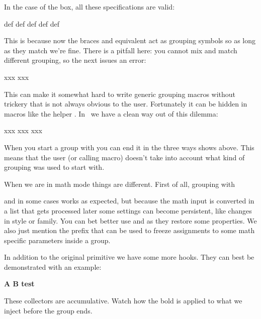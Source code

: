 In the case of the box, all these specifications are valid:

\starttyping[option=TEX]
\hbox {def}
\hbox \bgroup def\egroup
\hbox \bgroup def}
\hbox \bgroup d{e\egroup f}
\hbox {def\egroup
\stoptyping

This is because now the braces and equivalent act as grouping symbols so as long
as they match we're fine. There is a pitfall here: you cannot mix and match
different grouping, so the next issues an error:

\starttyping[option=TEX]
\bgroup xxx\endgroup   %
\begingroup xxx\egroup %
\stoptyping

This can make it somewhat hard to write generic grouping macros without trickery
that is not always obvious to the user. Fortunately it can be hidden in macros
like the helper \typ {\groupedcommand}. In \LUAMETATEX\ we have a clean way out
of this dilemma:

\starttyping[option=TEX]
\beginsimplegroup xxx\endsimplegroup
\beginsimplegroup xxx\endgroup
\beginsimplegroup xxx\egroup
\stoptyping

When you start a group with \typ {\beginsimplegroup} you can end it in the three
ways shows above. This means that the user (or calling macro) doesn't take into
account what kind of grouping was used to start with.

When we are in math mode things are different. First of all, grouping with \typ
{\begingroup} and \typ {\endgroup} in some cases works as expected, but because
the math input is converted in a list that gets processed later some settings can
become persistent, like changes in style or family. You can bet better use \typ
{\beginmathgroup} and \typ {\endmathgroup} as they restore some properties. We
also just mention the \type {\frozen} prefix that can be used to freeze
assignments to some math specific parameters inside a group.

\stopsectionlevel

\startsectionlevel[title=Hooks]

In addition to the original \type {\aftergroup} primitive we have some more
hooks. They can best be demonstrated with an example:

\startbuffer
\begingroup \bf
    \aftergroup   A 
    \atendofgroup B 
    test
\endgroup
\stopbuffer

\typebuffer[option=TEX]

These collectors are accumulative. Watch how the bold is applied to what we
inject before the group ends.

}
